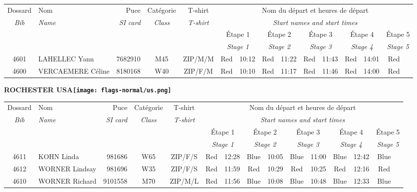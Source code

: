 \documentclass{report}
\begin{document}
  \begin{longtable}{|c|l|r|c|c|*{5}{cc|}}
    Dossard & Nom  & Puce    & Catégorie & T-shirt & \multicolumn{10}{c|}{Nom du départ et heures de départ} \\
    \itshape Bib     & \itshape Name & \itshape SI card & \itshape Class  & \itshape  T-shirt  & \multicolumn{10}{c|}{\itshape Start names and start times} \\
    \hline
    & & & & & \multicolumn{2}{c|}{Étape 1} & \multicolumn{2}{c|}{Étape 2} & \multicolumn{2}{c|}{Étape 3} & \multicolumn{2}{c|}{Étape 4} & \multicolumn{2}{c|}{Étape 5} \\
    & & & & & \multicolumn{2}{c|}{\itshape Stage 1} & \multicolumn{2}{c|}{\itshape Stage 2} & \multicolumn{2}{c|}{\itshape Stage 3} & \multicolumn{2}{c|}{\itshape Stage 4} & \multicolumn{2}{c|}{\itshape Stage 5} \\
    \hline
    4601 & LAHELLEC Yann & 7682910 & M45 & ZIP/M/M & Red & 10:12 & Red & 11:22 & Red & 11:43 & Red & 14:01 & Red &  \\
    4600 & VERCAEMERE Céline & 8180168 & W40 & ZIP/F/M & Red & 10:10 & Red & 11:17 & Red & 11:46 & Red & 14:00 & Red &  \\
  \end{longtable}
\newpage
  \Huge \centering \bfseries ROCHESTER  USA\normalfont \footnotesize \sffamily \hfill \texttt{[image: flags-normal/us.png]} \newline 
  \begin{longtable}{|c|l|r|c|c|*{5}{cc|}}
    Dossard & Nom  & Puce    & Catégorie & T-shirt & \multicolumn{10}{c|}{Nom du départ et heures de départ} \\
    \itshape Bib     & \itshape Name & \itshape SI card & \itshape Class  & \itshape  T-shirt  & \multicolumn{10}{c|}{\itshape Start names and start times} \\
    \hline
    & & & & & \multicolumn{2}{c|}{Étape 1} & \multicolumn{2}{c|}{Étape 2} & \multicolumn{2}{c|}{Étape 3} & \multicolumn{2}{c|}{Étape 4} & \multicolumn{2}{c|}{Étape 5} \\
    & & & & & \multicolumn{2}{c|}{\itshape Stage 1} & \multicolumn{2}{c|}{\itshape Stage 2} & \multicolumn{2}{c|}{\itshape Stage 3} & \multicolumn{2}{c|}{\itshape Stage 4} & \multicolumn{2}{c|}{\itshape Stage 5} \\
    \hline
    4611 & KOHN Linda & 981686 & W65 & ZIP/F/S & Red & 12:28 & Blue & 10:05 & Blue & 11:00 & Blue & 12:42 & Blue &  \\
    4612 & WORNER Lindsay & 981696 & W35 & ZIP/F/S & Red & 11:59 & Red & 10:29 & Red & 10:25 & Red & 12:16 & Red &  \\
    4610 & WORNER Richard & 9101558 & M70 & ZIP/M/L & Red & 11:56 & Blue & 10:08 & Blue & 10:48 & Blue & 12:33 & Blue &  \\
  \end{longtable}
\end{document}
